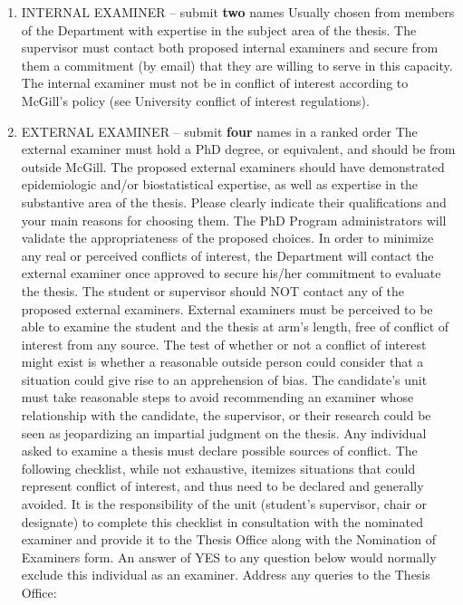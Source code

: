 \documentclass[
  letterpaper,
  DIV=11,
  numbers=noendperiod]{scrreprt}
\begin{document}
\begin{enumerate}
\def\labelenumi{\arabic{enumi}.}
\item
  INTERNAL EXAMINER -- submit \textbf{two} names Usually chosen from
  members of the Department with expertise in the subject area of the
  thesis. The supervisor must contact both proposed internal examiners
  and secure from them a commitment (by email) that they are willing to
  serve in this capacity. The internal examiner must not be in conflict
  of interest according to McGill's policy (see University conflict of
  interest regulations).
\item
  EXTERNAL EXAMINER -- submit \textbf{four} names in a ranked order The
  external examiner must hold a PhD degree, or equivalent, and should be
  from outside McGill. The proposed external examiners should have
  demonstrated epidemiologic and/or biostatistical expertise, as well as
  expertise in the substantive area of the thesis. Please clearly
  indicate their qualifications and your main reasons for choosing them.
  The PhD Program administrators will validate the appropriateness of
  the proposed choices. In order to minimize any real or perceived
  conflicts of interest, the Department will contact the external
  examiner once approved to secure his/her commitment to evaluate the
  thesis. The student or supervisor should NOT contact any of the
  proposed external examiners. External examiners must be perceived to
  be able to examine the student and the thesis at arm's length, free of
  conflict of interest from any source. The test of whether or not a
  conflict of interest might exist is whether a reasonable outside
  person could consider that a situation could give rise to an
  apprehension of bias. The candidate's unit must take reasonable steps
  to avoid recommending an examiner whose relationship with the
  candidate, the supervisor, or their research could be seen as
  jeopardizing an impartial judgment on the thesis. Any individual asked
  to examine a thesis must declare possible sources of conflict. The
  following checklist, while not exhaustive, itemizes situations that
  could represent conflict of interest, and thus need to be declared and
  generally avoided. It is the responsibility of the unit (student's
  supervisor, chair or designate) to complete this checklist in
  consultation with the nominated examiner and provide it to the Thesis
  Office along with the Nomination of Examiners form. An answer of YES
  to any question below would normally exclude this individual as an
  examiner. Address any queries to the Thesis Office:
\end{enumerate}
\end{document}
